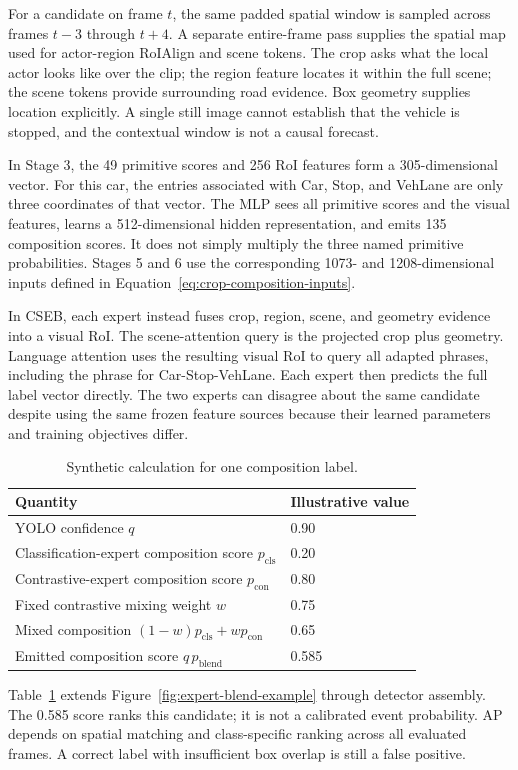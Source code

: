For a candidate on frame \(t\), the same padded spatial window is sampled across frames \(t-3\) through \(t+4\). A separate entire-frame pass supplies the spatial map used for actor-region RoIAlign and scene tokens. The crop asks what the local actor looks like over the clip; the region feature locates it within the full scene; the scene tokens provide surrounding road evidence. Box geometry supplies location explicitly. A single still image cannot establish that the vehicle is stopped, and the contextual window is not a causal forecast.

In Stage 3, the 49 primitive scores and 256 RoI features form a 305-dimensional vector. For this car, the entries associated with Car, Stop, and VehLane are only three coordinates of that vector. The MLP sees all primitive scores and the visual features, learns a 512-dimensional hidden representation, and emits 135 composition scores. It does not simply multiply the three named primitive probabilities. Stages 5 and 6 use the corresponding 1073- and 1208-dimensional inputs defined in Equation~\ref{eq:crop-composition-inputs}.

In CSEB, each expert instead fuses crop, region, scene, and geometry evidence into a visual RoI. The scene-attention query is the projected crop plus geometry. Language attention uses the resulting visual RoI to query all adapted phrases, including the phrase for Car-Stop-VehLane. Each expert then predicts the full label vector directly. The two experts can disagree about the same candidate despite using the same frozen feature sources because their learned parameters and training objectives differ.

\begin{table}[htbp]
\centering
\caption{Synthetic calculation for one composition label.}
\label{tab:worked-score}
\begin{singlespace}
\begin{tabularx}{\textwidth}{@{}Xl@{}}
\toprule
\textbf{Quantity} & \textbf{Illustrative value}\\
\midrule
YOLO confidence \(q\) & 0.90\\
Classification-expert composition score \(p_{\mathrm{cls}}\) & 0.20\\
Contrastive-expert composition score \(p_{\mathrm{con}}\) & 0.80\\
Fixed contrastive mixing weight \(w\) & 0.75\\
Mixed composition \((1-w)p_{\mathrm{cls}}+wp_{\mathrm{con}}\) & 0.65\\
Emitted composition score \(q\,p_{\mathrm{blend}}\) & 0.585\\
\bottomrule
\end{tabularx}
\end{singlespace}
\end{table}

Table~\ref{tab:worked-score} extends Figure~\ref{fig:expert-blend-example} through detector assembly. The 0.585 score ranks this candidate; it is not a calibrated event probability. AP depends on spatial matching and class-specific ranking across all evaluated frames. A correct label with insufficient box overlap is still a false positive.
